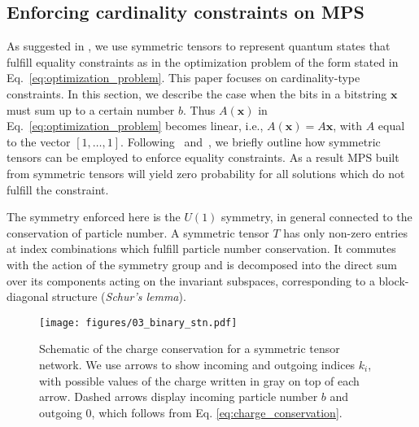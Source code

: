 \subsection{Enforcing cardinality constraints on MPS}\label{sec:symmetric_mps}

As suggested in \cite{lopezpiqueres2023symmetric}, we use symmetric tensors to represent quantum states that fulfill equality constraints as in the optimization problem of the form stated in Eq.~\eqref{eq:optimization_problem}. This paper focuses on cardinality-type constraints. In this section, we describe the case when the bits in a bitstring $\mathbf{x}$ must sum up to a certain number $b$. Thus $A(\mathbf{x})$ in Eq.~\eqref{eq:optimization_problem} becomes linear, i.e., $A(\mathbf{x}) = A\mathbf{x}$, with $A$ equal to the vector $[1,\ldots,1]$. 
Following~\cite{lopezpiqueres2023symmetric} and~\cite{PhysRevB.83.115125}, we briefly outline how symmetric tensors can be employed to enforce equality constraints. As a result MPS built from symmetric tensors will yield zero probability for all solutions which do not fulfill the constraint. 

The symmetry enforced here is the $U(1)$ symmetry, in general connected to the conservation of particle number. A symmetric tensor $T$ has only non-zero entries at index combinations which fulfill particle number conservation. It commutes with the action of the symmetry group and is decomposed into the direct sum over its components acting on the invariant subspaces, corresponding to a block-diagonal structure (\emph{Schur's lemma}).

\begin{figure}[!htbp]
    \centering
    \texttt{[image: figures/03\_binary\_stn.pdf]}
    \caption{Schematic of the charge conservation for a symmetric tensor network. We use arrows to show incoming and outgoing indices $k_i$, with possible values of the charge written in gray on top of each arrow. Dashed arrows display incoming particle number $b$ and outgoing $0$, which follows from Eq. \eqref{eq:charge_conservation}.}
    \label{fig:symmetric_TN}
\end{figure}

